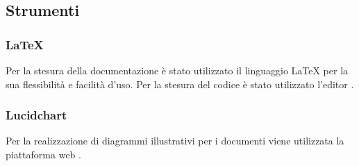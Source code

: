 \documentclass[../NormediProgetto.tex]{subfiles}
\begin{document}
\subsection{Strumenti}

\subsubsection{\LaTeX{}}

Per la stesura della documentazione è stato utilizzato il linguaggio \LaTeX{} per la sua flessibilità e facilità d'uso.
Per la stesura del codice è stato utilizzato l’editor .

\subsubsection{Lucidchart}

Per la realizzazione di diagrammi illustrativi per i documenti viene utilizzata la piattaforma web .
\end{document}
